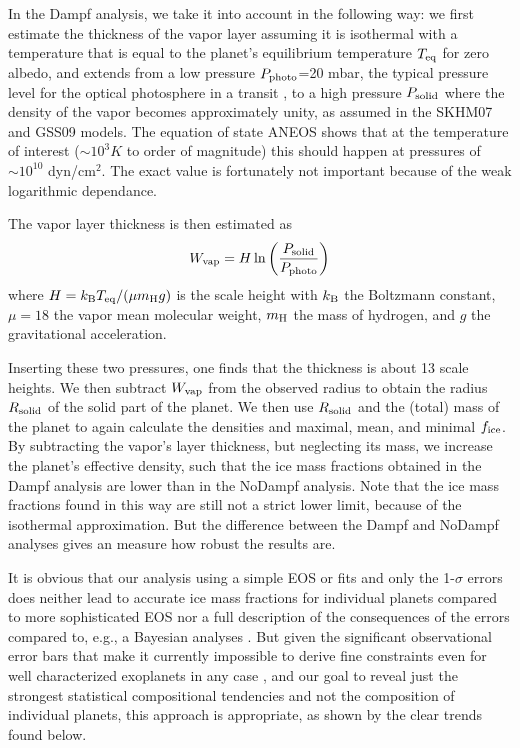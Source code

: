\documentclass[]{emulateapj}
\begin{document}
In the Dampf analysis, we take it into account in the following way: we first estimate the thickness of the vapor layer assuming it is isothermal with a temperature  that is equal  to the planet's equilibrium temperature $T_{\rm eq}$ for zero albedo, and extends from a low pressure $P_{\rm photo}$=20 mbar, the typical pressure level for the optical photosphere in a transit \citep{Lopez2016}, to  a high pressure $P_{\rm solid}$ where the density of  the vapor becomes  approximately unity, as assumed in the SKHM07 and GSS09 models. The equation of state ANEOS \citep{Thompson1990} shows that at the temperature of interest ($\sim10^3 K$ to order of magnitude) this should happen at pressures of $\sim10^{10}$ dyn/cm$^2$. The exact value is fortunately not important because of the weak logarithmic dependance.

The vapor layer thickness is then estimated as 
\begin{equation}
W_{\rm vap}=H  \ln\left(\frac{P_{\rm solid}}{P_{\rm photo}}\right)
\end{equation}
where $H=k_{\rm B} T_{\rm eq} / (\mu m_{\rm H} g)$ is the scale height with  $k_{\rm B}$ the Boltzmann  constant,  $\mu=18$ the vapor mean molecular weight, $m_{\rm H}$ the mass of  hydrogen, and $g$ the gravitational acceleration. 

Inserting these two pressures, one finds that the thickness is about 13 scale heights. We then subtract $W_{\rm vap}$ from the observed radius to obtain the radius $R_{\rm solid}$ of the solid part of the planet.  We  then  use $R_{\rm solid}$ and the (total) mass of the planet to again calculate the densities and  maximal,  mean, and minimal  $f_{\rm ice}$.  By subtracting  the vapor's  layer thickness, but neglecting its mass, we increase the planet's effective density, such that the ice mass fractions obtained in the Dampf analysis are lower than in the NoDampf  analysis. Note that the ice mass fractions found in this way are still not a strict lower limit, because of the isothermal approximation. But the difference between the Dampf and NoDampf analyses gives an measure how robust the results are.  

It is obvious that our analysis using a simple EOS or fits and only the  1-$\sigma$ errors does neither lead to accurate ice mass fractions for individual planets compared to more sophisticated EOS nor a full description of the consequences of the errors compared to, e.g., a Bayesian analyses \citep[e.g.,][]{Rogers2015,Dorn2017a}. But given the significant observational error bars that make it currently impossible to derive fine constraints even for well characterized exoplanets in any case \citep{Dorn2017b}, and our goal to reveal just the strongest statistical compositional tendencies and not the composition of individual planets, this approach is appropriate, as shown by the clear trends found below.   
\end{document}
